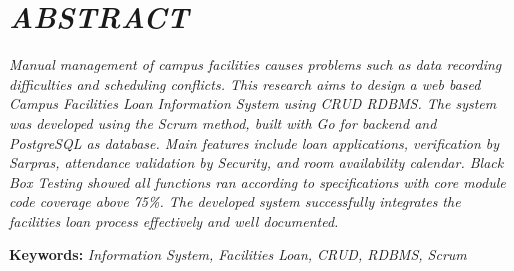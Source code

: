 \chapter*{\textit{ABSTRACT}}

\begin{singlespace}
\sloppy
\noindent
\textit{Manual management of campus facilities causes problems such as data recording difficulties and scheduling conflicts. This research aims to design a web based Campus Facilities Loan Information System using CRUD RDBMS. The system was developed using the Scrum method, built with Go for backend and PostgreSQL as database. Main features include loan applications, verification by Sarpras, attendance validation by Security, and room availability calendar. Black Box Testing showed all functions ran according to specifications with core module code coverage above 75\%. The developed system successfully integrates the facilities loan process effectively and well documented.}

\vspace{0.5cm}
\noindent
\textbf{Keywords:} \textit{Information System, Facilities Loan, CRUD, RDBMS, Scrum}
\end{singlespace}
